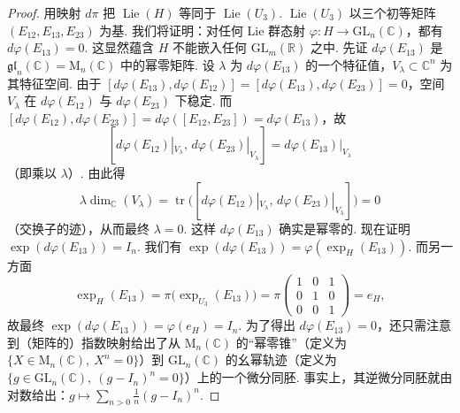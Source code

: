 \begin{proof}
用映射 $d\pi$ 把 $\operatorname{Lie}(H)$ 等同于 $\operatorname{Lie}(U_{3})$. $\operatorname{Lie}(U_{3})$ 以三个初等矩阵 $(E_{12},E_{13},E_{23})$ 为基. 我们将证明：对任何 Lie 群态射 $\varphi:H\longrightarrow\mathrm{GL}_{n}(\mathbb C)$，都有 $d\varphi(E_{13})=0$. 这显然蕴含 $H$ 不能嵌入任何 $\mathrm{GL}_{m}(\mathbb R)$ 之中.
先证 $d\varphi(E_{13})$ 是 $\mathfrak{gl}_{n}(\mathbb C)=\mathrm{M}_{n}(\mathbb C)$ 中的幂零矩阵. 设 $\lambda$ 为 $d\varphi(E_{13})$ 的一个特征值，$V_{\lambda}\subset\mathbb C^{n}$ 为其特征空间. 由于 $[d\varphi(E_{13}),d\varphi(E_{12})]=[d\varphi(E_{13}),d\varphi(E_{23})]=0$，空间 $V_{\lambda}$ 在 $d\varphi(E_{12})$ 与 $d\varphi(E_{23})$ 下稳定. 而 $[d\varphi(E_{12}),d\varphi(E_{23})]=d\varphi([E_{12},E_{23}])=d\varphi(E_{13})$，故
\[
[d\varphi(E_{12})|_{V_{\lambda}},\,d\varphi(E_{23})|_{V_{\lambda}}]=d\varphi(E_{13})|_{V_{\lambda}}
\]
（即乘以 $\lambda$）.
由此得
\[
\lambda\dim_{\mathbb C}(V_{\lambda})=\operatorname{tr}\bigl([d\varphi(E_{12})|_{V_{\lambda}},\,d\varphi(E_{23})|_{V_{\lambda}}]\bigr)=0
\]
（交换子的迹），从而最终 $\lambda=0$. 这样 $d\varphi(E_{13})$ 确实是幂零的.
现在证明 $\exp(d\varphi(E_{13}))=I_{n}$. 我们有 $\exp(d\varphi(E_{13}))=\varphi(\exp_{H}(E_{13}))$. 而另一方面
\[
\exp_{H}(E_{13})=\pi\bigl(\exp_{U_{3}}(E_{13})\bigr)=\pi\begin{pmatrix}1&0&1\\0&1&0\\0&0&1\end{pmatrix}=e_{H},
\]
故最终 $\exp(d\varphi(E_{13}))=\varphi(e_{H})=I_{n}$.
为了得出 $d\varphi(E_{13})=0$，还只需注意到（矩阵的）指数映射给出了从 $\mathrm{M}_{n}(\mathbb C)$ 的``幂零锥''（定义为 $\{X\in\mathrm{M}_{n}(\mathbb C),\ X^{n}=0\}$）到 $\mathrm{GL}_{n}(\mathbb C)$ 的幺幂轨迹（定义为 $\{g\in\mathrm{GL}_{n}(\mathbb C),\ (g-I_{n})^{n}=0\}$）上的一个微分同胚. 事实上，其逆微分同胚就由对数给出：$g\mapsto\sum_{n>0}\frac{1}{n}(g-I_{n})^{n}$.
\end{proof}

